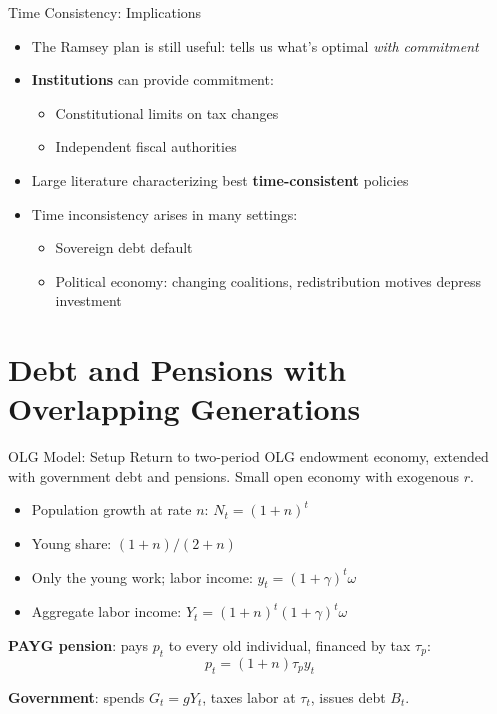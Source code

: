 \documentclass[blue]{beamer}
\begin{document}
\begin{frame}{Time Consistency: Implications}
	\begin{itemize}
		\item The Ramsey plan is still useful: tells us what's optimal \emph{with commitment}
		\item \textbf{Institutions} can provide commitment:
		\begin{itemize}
			\item Constitutional limits on tax changes
			\item Independent fiscal authorities
		\end{itemize}
		\item Large literature characterizing best \textbf{time-consistent} policies
		\item Time inconsistency arises in many settings:
		\begin{itemize}
			\item Sovereign debt default
			\item Political economy: changing coalitions, redistribution motives depress investment 
		\end{itemize}
	\end{itemize}
\end{frame}


\section{Debt and Pensions with Overlapping Generations}

\begin{frame}{OLG Model: Setup}
	Return to two-period OLG endowment economy, extended with government debt and pensions. Small open economy with exogenous $r$.
	
	\begin{itemize}
		\item Population growth at rate $n$: $N_t = (1+n)^t$
		\item Young share: $(1+n)/(2+n)$
		\item Only the young work; labor income: $y_t = (1+\gamma)^t \omega$
		\item Aggregate labor income: $Y_t = (1+n)^t(1+\gamma)^t \omega$
	\end{itemize}
	
	\textbf{PAYG pension}: pays $p_t$ to every old individual, financed by tax $\tau_p$:
	\[
	p_t = (1+n) \tau_p y_t
	\]
	
	\textbf{Government}: spends $G_t = gY_t$, taxes labor at $\tau_t$, issues debt $B_t$.
\end{frame}
\end{document}

